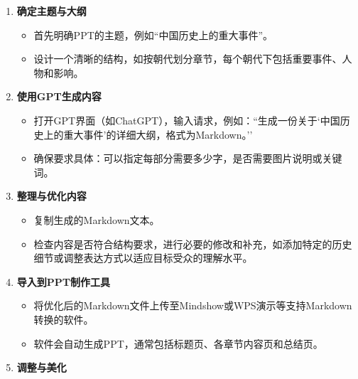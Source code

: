 \begin{enumerate}
  \def\labelenumi{\arabic{enumi}.}

  \item
        \textbf{确定主题与大纲}

        \begin{itemize}

          \item
                首先明确PPT的主题，例如``中国历史上的重大事件''。
          \item
                设计一个清晰的结构，如按朝代划分章节，每个朝代下包括重要事件、人物和影响。
        \end{itemize}
  \item
        \textbf{使用GPT生成内容}

        \begin{itemize}

          \item
                打开GPT界面（如ChatGPT），输入请求，例如：``生成一份关于`中国历史上的重大事件'的详细大纲，格式为Markdown。''
          \item
                确保要求具体：可以指定每部分需要多少字，是否需要图片说明或关键词。
        \end{itemize}
  \item
        \textbf{整理与优化内容}

        \begin{itemize}

          \item
                复制生成的Markdown文本。
          \item
                检查内容是否符合结构要求，进行必要的修改和补充，如添加特定的历史细节或调整表达方式以适应目标受众的理解水平。
        \end{itemize}
  \item
        \textbf{导入到PPT制作工具}

        \begin{itemize}

          \item
                将优化后的Markdown文件上传至Mindshow或WPS演示等支持Markdown转换的软件。
          \item
                软件会自动生成PPT，通常包括标题页、各章节内容页和总结页。
        \end{itemize}
  \item
        \textbf{调整与美化}

        \begin{itemize}


\end{itemize}
\end{enumerate}
